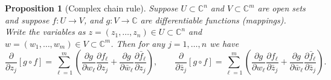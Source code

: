 \documentclass[12pt,openany]{book}
\newcommand{\C}{{\mathbb{C}}}
\theoremstyle{plain}
\newtheorem{prop}[thm]{Proposition}
\theoremstyle{remark}
\theoremstyle{definition}
\theoremstyle{exercise}
\theoremstyle{example}
\begin{document}
\begin{prop}[Complex chain rule]
Suppose 
$U \subset \C^n$ and $V \subset \C^m$ are open sets and suppose
$f \colon U \to V$, and $g \colon V \to \C$ are differentiable
functions (mappings).  Write the variables as
$z = (z_1,\ldots,z_n) \in U \subset \C^n$ and $w = (w_1,\ldots,w_m) \in V
\subset \C^m$.  Then for any $j=1,\ldots,n$ we have
\begin{equation} \label{eq:chainrule}
\frac{\partial}{\partial z_j} \left[ g \circ f \right]
=
\sum_{\ell=1}^m \left(
\frac{\partial g}{\partial w_\ell}
\frac{\partial f_\ell}{\partial z_j}
+
\frac{\partial g}{\partial \bar{w}_\ell}
\frac{\partial \bar{f}_\ell}{\partial z_j}
\right),  \qquad
\frac{\partial}{\partial \bar{z}_j} \left[ g \circ f \right]
=
\sum_{\ell=1}^m \left(
\frac{\partial g}{\partial w_\ell}
\frac{\partial f_\ell}{\partial \bar{z}_j}
+
\frac{\partial g}{\partial \bar{w}_\ell}
\frac{\partial \bar{f}_\ell}{\partial \bar{z}_j}
\right) .
\end{equation}
\end{prop}
\end{document}
